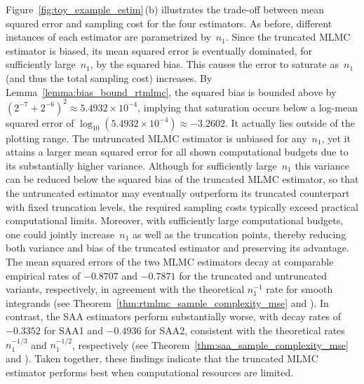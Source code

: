 \documentclass[11pt]{article}
\begin{document}
Figure~\ref{fig:toy_example_estim}\,(b) illustrates the trade-off between mean squared error and sampling cost for the four estimators. As before, different instances of each estimator are parametrized by~$n_1$. Since the truncated MLMC estimator is biased, its mean squared error is eventually dominated, for sufficiently large~$n_1$, by the squared bias. This causes the error to saturate as~$n_1$ (and thus the total sampling cost) increases. By Lemma~\ref{lemma:bias_bound_rtmlmc}, the squared bias is bounded above by $(2^{-7}+2^{-6})^2\approx 5.4932\times10^{-4}$, implying that saturation occurs below a log-mean squared error of $\log_{10}(5.4932\times10^{-4})\approx -3.2602$. It actually lies outside of the plotting range. The untruncated MLMC estimator is unbiased for any~$n_1$, yet it attains a larger mean squared error for all shown computational budgets due to its substantially higher variance. Although for sufficiently large~$n_1$ this variance can be reduced below the squared bias of the truncated MLMC estimator, so that the untruncated estimator may eventually outperform its truncated counterpart with fixed truncation levels, the required sampling costs typically exceed practical computational limits. Moreover, with sufficiently large computational budgets, one could jointly increase~$n_1$ as well as the truncation points, thereby reducing both variance and bias of the truncated estimator and preserving its advantage. The mean squared errors of the two MLMC estimators decay at comparable empirical rates of $-0.8707$ and $-0.7871$ for the truncated and untruncated variants, respectively, in agreement with the theoretical $n_1^{-1}$ rate for smooth integrands (see Theorem~\ref{thm:rtmlmc_sample_complexity_mse} and \cite[Corollary~2.3]{syed2023optimal}). In contrast, the SAA estimators perform substantially worse, with decay rates of $-0.3352$ for SAA1 and $-0.4936$ for SAA2, consistent with the theoretical rates $n_1^{-1/3}$ and $n_1^{-1/2}$, respectively (see Theorem~\ref{thm:saa_sample_complexity_mse} and \cite[Appendix~G]{rainforth2018nesting}). Taken together, these findings indicate that the truncated MLMC estimator performs best when computational resources are limited.
\end{document}
